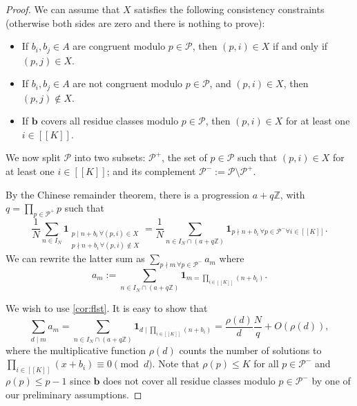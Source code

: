 \documentclass[11pt]{amsart}
\theoremstyle{definition}
\renewcommand{\leq}{\leqslant}
\newcommand{\sinterval}[1]{[\![#1]\!] }
\newcommand{\ind}[1]{\mathbf{1}_{#1}}
\newcommand{\Z}{\mathbb{Z}}
\newcommand{\N}{I_N}
\newcommand{\primes}{\mathcal{P}}
\newcommand{\sommespart}{b}
\renewcommand{\vec}{\boldsymbol}
\newcommand{\repK}{K}
\newcommand{\newK}{\sinterval{K}}
\newcommand{\Div}{X}
\begin{document}
\begin{proof}
We can assume that $\Div$ satisfies the following consistency constraints (otherwise both sides are zero and there is nothing to prove):
\begin{itemize}
	\item If $\sommespart_i, \sommespart_j\in A$ are congruent modulo $p\in \primes$, then $(p, i) \in \Div$ if and only if $(p, j) \in \Div$.
	\item If $\sommespart_i, \sommespart_j\in A$ are not congruent modulo $p\in \primes$, and $(p, i) \in \Div$, then $(p, j) \notin \Div$.
	\item If $\vec{\sommespart}$ covers all residue classes modulo $p\in \primes$, then $(p, i) \in \Div$ for at least one $i\in \newK$.
\end{itemize}

We now split $\primes$ into two subsets: $\primes^+$, the set of $p\in \primes$ such that $(p, i) \in \Div$ for at least one $i\in\newK$; and its complement $\primes^- := \primes \setminus \primes^+$.

By the Chinese remainder theorem, there is a progression $a+q\Z$, with $q =\prod_{p\in \primes^+} p$ such that 
\begin{equation*}
\frac{1}{N} \sum_{n\in \N} \ind{\substack{p\mid n+\sommespart_i\, \forall (p, i)\in \Div \\ p\nmid n+\sommespart_i\, \forall (p, i)\notin \Div}} = \frac{1}{N} \sum_{n\in \N \cap (a+q\Z)} \ind{p\nmid n+\sommespart_i\, \forall p\in \primes^- \forall i\in \newK}.
\end{equation*}
We can rewrite the latter sum as $\sum_{p\nmid m\, \forall p\in \primes^-} a_m$ where 
\begin{equation*}
a_m := \sum_{n\in \N\cap (a+q\Z)}\ind{m = \prod_{i\in \newK} (n+\sommespart_i) }.
\end{equation*}

We wish to use \cref{cor:flst}. It is easy to show that
\begin{equation*}
\sum_{d\mid m} a_m = \sum_{n\in \N \cap (a+q\Z)} \ind{d\mid \prod_{i\in \newK} (n+\sommespart_i)} = \frac{\rho(d)}{d} \frac{N}{q} + O(\rho(d)),
\end{equation*}
where the multiplicative function $\rho(d)$ counts the number of solutions to $\prod_{i\in\newK} (x+\sommespart_i)\equiv 0 \pmod d$. Note that $\rho(p) \leq \repK$ for all $p\in \primes^{-}$ and $\rho(p) \leq p-1$ since $\vec{\sommespart}$ does not cover all residue classes modulo $p \in \primes^{-}$ by one of our preliminary assumptions. 


\end{proof}
\end{document}
